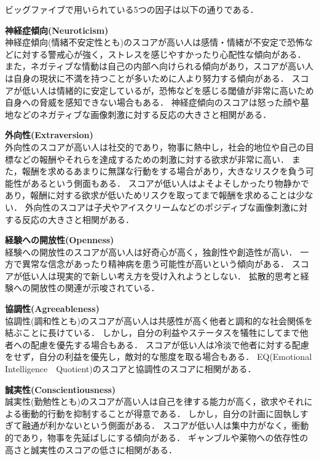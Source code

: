 ビッグファイブで用いられている5つの因子は以下の通りである\cite{daniel}．
\begin{description}
    \item{\textbf{神経症傾向(Neuroticism)}}\mbox{}\\
    神経症傾向(情緒不安定性とも)のスコアが高い人は感情・情緒が不安定で恐怖などに対する警戒心が強く，ストレスを感じやすかったり心配性な傾向がある．
    また，ネガティブな情動は自己の内部へ向けられる傾向があり，スコアが高い人は自身の現状に不満を持つことが多いために人より努力する傾向がある．
    スコアが低い人は情緒的に安定しているが，恐怖などを感じる閾値が非常に高いため自身への脅威を感知できない場合もある．
    神経症傾向のスコアは怒った顔や墓地などのネガティブな画像刺激に対する反応の大きさと相関がある．
    \item{\textbf{外向性(Extraversion)}}\mbox{}\\
    外向性のスコアが高い人は社交的であり，物事に熱中し，社会的地位や自己の目標などの報酬やそれらを達成するための刺激に対する欲求が非常に高い．
    また，報酬を求めるあまりに無謀な行動をする場合があり，大きなリスクを負う可能性があるという側面もある．
    スコアが低い人はよそよそしかったり物静かであり，報酬に対する欲求が低いためリスクを取ってまで報酬を求めることは少ない．
    外向性のスコアは子犬やアイスクリームなどのポジディブな画像刺激に対する反応の大きさと相関がある．
    \item{\textbf{経験への開放性(Openness)}}\mbox{}\\
    経験への開放性のスコアが高い人は好奇心が高く，独創性や創造性が高い．
    一方で異常な信念があったり精神病を患う可能性が高いという傾向がある．
    スコアが低い人は現実的で新しい考え方を受け入れようとしない．
    拡散的思考と経験への開放性の関連が示唆されている．
    \item{\textbf{協調性(Agreeableness)}}\mbox{}\\
    協調性(調和性とも)のスコアが高い人は共感性が高く他者と調和的な社会関係を結ぶことに長けている．
    しかし，自分の利益やステータスを犠牲にしてまで他者への配慮を優先する場合もある．
    スコアが低い人は冷淡で他者に対する配慮をせず，自分の利益を優先し，敵対的な態度を取る場合もある．
    EQ(Emotional Intelligence　Quotient)のスコアと協調性のスコアに相関がある．
    \item{\textbf{誠実性(Conscientiousness)}}\mbox{}\\
    誠実性(勤勉性とも)のスコアが高い人は自己を律する能力が高く，欲求やそれによる衝動的行動を抑制することが得意である．
    しかし，自分の計画に固執しすぎて融通が利かないという側面がある．
    スコアが低い人は集中力がなく，衝動的であり，物事を先延ばしにする傾向がある．
    ギャンブルや薬物への依存性の高さと誠実性のスコアの低さに相関がある．
\end{description}

